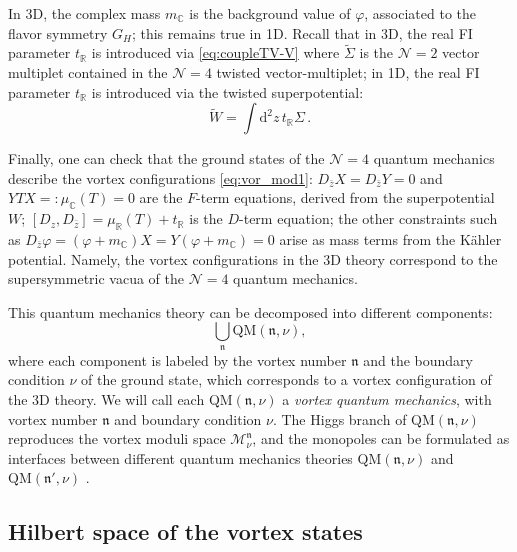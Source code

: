 \documentclass[12pt,a4paper]{article}
\newcommand{\nn}{\mathfrak{n}}
\renewcommand{\(}{\left(}
\renewcommand{\)}{\right)}
\renewcommand{\(}{\left(}
\renewcommand{\)}{\right)}
\begin{document}
\smallskip

In 3D, the complex mass $m_{\mathbb{C}}$ is the background value of $\varphi$, associated to the flavor symmetry $G_H$; this remains true in 1D.
Recall that in 3D, the real FI parameter $t_{\mathbb{R}}$ is introduced via  \eqref{eq:coupleTV-V} where $\tilde{\Sigma}$ is the $\mathcal{N}=2$ vector multiplet contained in the $\mathcal{N}=4$ twisted vector-multiplet; in 1D, the real FI parameter $t_{\mathbb{R}}$ is introduced via the twisted superpotential:
\begin{equation}
\widetilde{W}=\int\mathrm{d}^2 z \, t_{\mathbb{R}}\Sigma\,.
\end{equation}

\smallskip

Finally, one can check that the ground states of the $\mathcal{N}=4$ quantum mechanics describe the vortex configurations \eqref{eq:vor_mod1}:
$D_{\bar{z}}X=D_{\bar{z}}Y=0$ and $YTX=:\mu_{\mathbb{C}}(T)=0$ are the $F$-term equations, derived from the superpotential $W$; $[D_{z},D_{\bar{z}}]=\mu_{\mathbb{R}}(T)+t_{\mathbb{R}}$ is the $D$-term equation; 
the other constraints such as $D_{\bar{z}}\varphi=(\varphi+m_{\mathbb{C}})X=
Y(\varphi+m_{\mathbb{C}})=0$ arise as mass terms from the K\"{a}hler potential. 
Namely, the vortex configurations in the 3D theory correspond to the supersymmetric vacua of the $\mathcal{N}=4$ quantum mechanics.

\medskip

This quantum mechanics theory can be decomposed into different components:
\begin{equation}
\bigcup_{\nn} \textrm{QM}(\nn,\nu),
\end{equation}
where each component is labeled by the vortex number $\nn$ and the boundary condition $\nu$ of the ground state, which corresponds to a vortex configuration of the 3D theory. 
We will call each QM$(\nn,\nu)$ a \textit{vortex quantum mechanics}, with vortex number $\nn$ and boundary condition $\nu$.
The Higgs branch of $\textrm{QM}(\nn,\nu)$ reproduces the vortex moduli space $\mathcal{M}_\nu^\nn$, and the monopoles can be formulated as interfaces between different quantum mechanics theories $\textrm{QM}(\nn,\nu)$ and $\textrm{QM}(\nn',\nu)$ \cite{Bullimore:2016hdc}. 


\medskip

\subsection{Hilbert space of the vortex states}\label{ssec:vortex_Hilbert}
	
\end{document}
